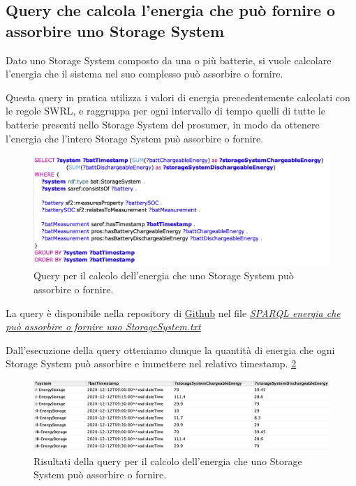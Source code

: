 \subsection{Query che calcola l'energia che può fornire o assorbire uno Storage System} \label{subquery}

Dato uno Storage System composto da una o più batterie, si vuole calcolare l'energia che il sistema nel suo complesso può assorbire o fornire.

Questa query in pratica utilizza i valori di energia precedentemente calcolati con le regole SWRL, e raggruppa per ogni intervallo di tempo quelli di tutte le batterie presenti nello Storage System del prosumer, in modo da ottenere l'energia che l'intero Storage System può assorbire o fornire.

\begin{figure}[H]
    \centering
    \includegraphics[width=15cm]{images/subquery.png}
    \caption{Query per il calcolo dell'energia che uno Storage System può assorbire o fornire.}
    \label{fig:subquery}
\end{figure}

La query è disponibile nella repository di \href{https://github.com/19eddie/SemanticWeb-Assignment02-03}{Github} nel file \href{https://github.com/19eddie/SemanticWeb-Assignment02-03/blob/main/SPARQL%20energia%20che%20pu%C3%B2%20assorbire%20o%20fornire%20uno%20StorageSystem.txt}{\textit{SPARQL energia che può assorbire o fornire uno StorageSystem.txt}}

Dall'esecuzione della query otteniamo dunque la quantità di energia che ogni Storage System può assorbire e immettere nel relativo timestamp. \ref{fig:subquery_res}

\begin{figure}[H]
    \centering
    \includegraphics[width=15cm]{images/subquery_res.png}
    \caption{Risultati della query per il calcolo dell'energia che uno Storage System può assorbire o fornire.}
    \label{fig:subquery_res}
\end{figure}


